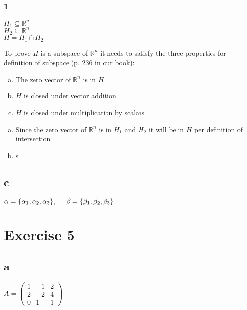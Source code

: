 \documentclass{article}
\begin{document}
\subsubsection*{1}

$H_{1} \subseteq \mathbb{R}^n$\\
$H_{2} \subseteq \mathbb{R}^n$\\
$H = H_{1} \cap H_{2}$

To prove $H$ is a subspace of $\mathbb{R}^n$ it needs to satisfy the three properties for definition of subspace (p. 236 in our book):\\
\begin{enumerate}[(a)]
    \item The zero vector of $\mathbb{R}^n$ is in $H$
    \item $H$ is closed under vector addition
    \item $H$ is closed under multiplication by scalars
\end{enumerate}

\begin{enumerate}[(a)]
    \item Since the zero vector of $\mathbb{R}^n$ is in $H_{1}$ and $H_{2}$ it will be in $H$ per definition of intersection
    \item  s
\end{enumerate}

\subsection*{c}

$\alpha = \{\alpha_{1}, \alpha_{2}, \alpha_{3}\}
, \hspace{5 mm}
\beta = \{\beta_{1}, \beta_{2}, \beta_{3}\}$

\section*{Exercise 5}

\subsection*{a}

$A=
\left (
    \begin{matrix}
        1 & -1 & 2\\
        2 & -2 & 4\\
        0 & 1 & 1
    \end{matrix}
\right )
$
\end{document}
